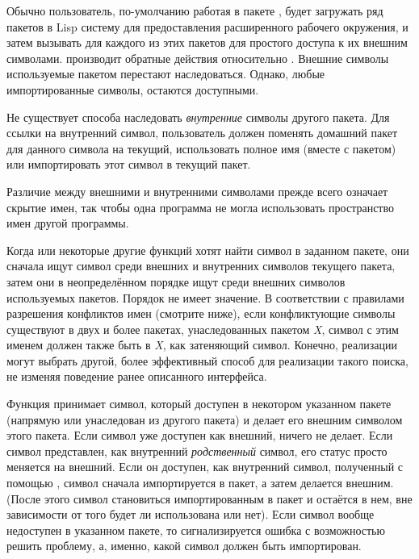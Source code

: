 Обычно пользователь, по-умолчанию работая в пакете , будет загружать
ряд пакетов в Lisp систему для предоставления расширенного рабочего окружения, и
затем вызывать  для каждого из этих пакетов для простого
доступа к их внешним символами.
 производит обратные действия относительно
. Внешние символы используемые пакетом перестают
наследоваться. Однако, любые импортированные символы, остаются доступными.

Не существует способа наследовать \emph{внутренние} символы другого пакета. Для
ссылки на внутренний символ, пользователь должен поменять домашний пакет для
данного символа на текущий, использовать полное имя (вместе с пакетом) или
импортировать этот символ в текущий пакет.

\begin{newer}
Различие между внешними и внутренними символами прежде всего означает скрытие
имен, так чтобы одна программа не могла использовать пространство имен другой
программы.
\end{newer}

Когда  или некоторые другие функций хотят найти символ в заданном
пакете, они сначала ищут символ среди внешних и внутренних символов текущего
пакета, затем они в неопределённом порядке ищут среди внешних символов
используемых пакетов. Порядок не имеет значение. В соответствии с правилами
разрешения конфликтов имен (смотрите ниже), если конфликтующие символы существуют
в двух и более пакетах, унаследованных пакетом \emph{X}, символ с этим именем
должен также быть в \emph{X}, как затеняющий символ. Конечно, реализации могут
выбрать другой, более эффективный способ для реализации такого поиска, не
изменяя поведение ранее описанного интерфейса.

Функция  принимает символ, который доступен в некотором указанном
пакете (напрямую или унаследован из другого пакета) и делает его внешним символом
этого пакета. Если символ уже доступен как внешний,  ничего не
делает. Если символ представлен, как внутренний \emph{родственный} символ, его
статус просто меняется на внешний. Если он доступен, как внутренний символ,
полученный с помощью , символ сначала импортируется в пакет, а
затем делается внешним. (После этого символ становиться импортированным в пакет
и остаётся в нем, вне зависимости от того будет ли использована
 или нет). Если символ вообще недоступен в указанном пакете,
то сигнализируется ошибка с возможностью решить проблему, а, именно, какой
символ должен быть импортирован.

